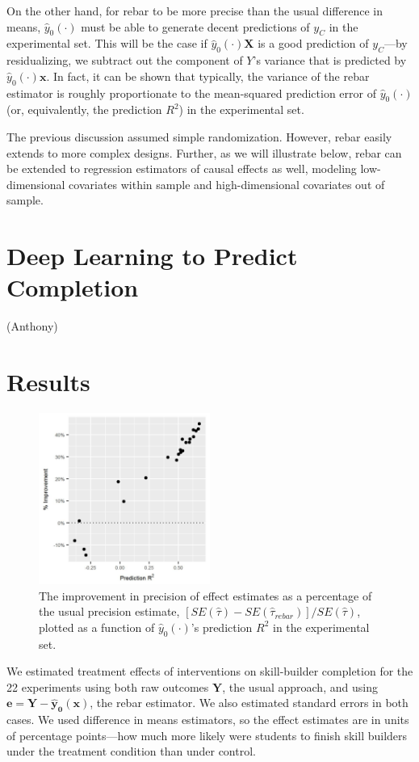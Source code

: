\documentclass{edm_template}
\newcommand{\tauhat}{\hat{\tau}}
\newcommand{\rebar}{\hat{\tau}_{rebar}}
\newcommand{\model}{\hat{y}_0(\cdot)}
\newcommand{\pred}{\hat{y}_0(\bm{x})}
\begin{document}
On the other hand, for rebar to be more precise than the usual difference in means, $\model$ must be able to generate decent predictions of $y_C$ in the experimental set. 
This will be the case if $\model{\bm{X}}$ is a good prediction of $y_C$---by residualizing, we subtract out the component of $Y$'s variance that is predicted by $\model{\bm{x}}$. 
In fact, it can be shown that typically, the variance of the rebar estimator is roughly proportionate to the mean-squared prediction error of $\model$ (or, equivalently, the prediction $R^2$) in the experimental set. 


The previous discussion assumed simple randomization. 
However, rebar easily extends to more complex designs.
Further, as we will illustrate below, rebar can be extended to regression estimators of causal effects as well, modeling low-dimensional covariates within sample and high-dimensional covariates out of sample. 


\section{Deep Learning to Predict Completion}
(Anthony)

\section{Results}

\begin{figure}
\centering
\includegraphics[width=0.5\textwidth]{corVsSE.jpg}
\caption{The improvement in precision of effect estimates as a percentage of the usual precision estimate, $[SE(\tauhat)-SE(\rebar)]/SE(\tauhat)$, plotted as a function of $\model$'s prediction $R^2$ in the experimental set.}
\label{fig:r2se}
\end{figure}

We estimated treatment effects of interventions on skill-builder completion for the 22 experiments using both raw outcomes $\bm{Y}$, the usual approach, and using $\bm{e}=\bm{Y}-\bm{\pred}$, the rebar estimator. 
We also estimated standard errors in both cases.
We used difference in means estimators, so the effect estimates are in units of percentage points---how much more likely were students to finish skill builders under the treatment condition than under control. 
\end{document}
